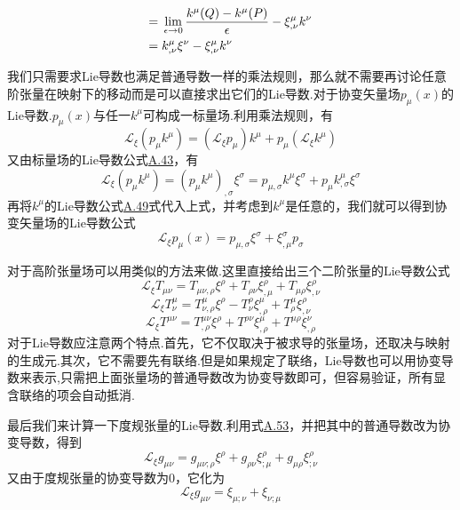 \documentclass[a4paper]{book}
\begin{document}
\begin{appendix}
\begin{align}
		={}&\lim_{\epsilon\rightarrow 0}\frac{k^\mu(Q)-k^{\mu}(P)}{\epsilon}-\xi^\mu_{,\nu}k^\nu \notag \\
		={}&k^\mu_{,\nu}\xi^\nu-\xi^{\mu}_{,\nu}k^{\nu}
\end{align}
\par
我们只需要求Lie导数也满足普通导数一样的乘法规则，那么就不需要再讨论任意阶张量在映射下的移动而是可以直接求出它们的Lie导数.对于协变矢量场$p_\mu(x)$的Lie导数.$p_\mu(x)$与任一$k^\mu$可构成一标量场.利用乘法规则，有
\begin{equation}
	\mathcal{L_{\xi}}(p_\mu k^\mu)=(\mathcal{L_{\xi}}p_\mu)k^\mu+p_\mu(	\mathcal{L_{\xi}}k^\mu)
\end{equation}
又由标量场的Lie导数公式\hyperref[A.43]{A.43}，有
\begin{equation}
	\mathcal{L_{\xi}}(p_\mu k^\mu)=(p_\mu k^\mu)_{,\sigma}\xi^\sigma=p_{\mu,\sigma}k^{\mu}\xi^{\sigma}+p_\mu k^\mu_{,\sigma}\xi^\sigma
\end{equation}
再将$k^\mu$的Lie导数公式\hyperref[A.49]{A.49}式代入上式，并考虑到$k^\mu$是任意的，我们就可以得到协变矢量场的Lie导数公式
\begin{equation}
\mathcal{L_{\xi}}p_\mu(x)=p_{\mu,\sigma}\xi^\sigma+\xi^\sigma_{,\mu}p_\sigma
\end{equation}\par 
对于高阶张量场可以用类似的方法来做.这里直接给出三个二阶张量的Lie导数公式
\begin{equation}\label{A.53}
	\mathcal{L_{\xi}}T_{\mu\nu}=T_{\mu\nu,\rho}\xi^\rho+T_{\rho\nu}\xi^\rho_{,\mu}+T_{\mu\rho}\xi^\rho_{,\nu}
\end{equation}
\begin{equation}
	\mathcal{L_{\xi}}T^{\mu}_\nu=T^\mu_{\nu,\rho}\xi^\rho-T^\rho_{\nu}\xi^\mu_{,\rho}+T^{\mu}_\rho\xi^\rho_{,\nu}
\end{equation}
\begin{equation}
	\mathcal{L_{\xi}}T^{\mu\nu}=T^{\mu\nu}_{,\rho}\xi^\rho+T^{\rho\nu}\xi^\mu_{,\rho}+T^{\mu\rho}\xi^\nu_{,\rho}
\end{equation}
对于Lie导数应注意两个特点.首先，它不仅取决于被求导的张量场，还取决与映射的生成元.其次，它不需要先有联络.但是如果规定了联络，Lie导数也可以用协变导数来表示,只需把上面张量场的普通导数改为协变导数即可，但容易验证，所有显含联络的项会自动抵消.\par 
最后我们来计算一下度规张量的Lie导数.利用式\hyperref[A.53]{A.53}，并把其中的普通导数改为协变导数，得到
\begin{equation}
\mathcal{L_{\xi}}g_{\mu\nu}	=g_{\mu\nu;\rho}\xi^\rho+g_{\rho\nu}\xi^\rho_{;\mu}+g_{\mu\rho}\xi^\rho_{;\nu}
\end{equation}
又由于度规张量的协变导数为0，它化为
\begin{equation}\label{A.57}
\mathcal{L_{\xi}}g_{\mu\nu}	=\xi_{\mu;\nu}+\xi_{\nu;\mu}
\end{equation}

\end{appendix}
\end{document}
